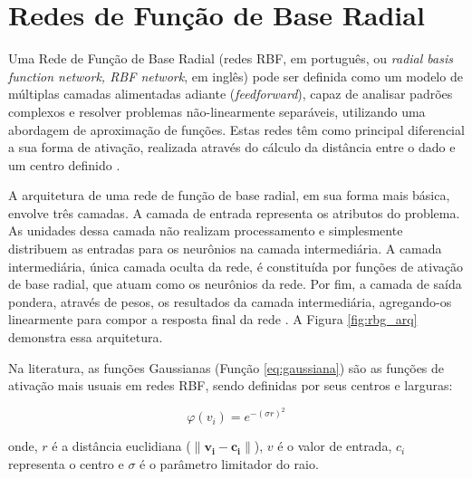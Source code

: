 \documentclass[msc, classic, a4paper]{ufbathesis}
\begin{document}
\section{Redes de Função de Base Radial}

Uma Rede de Função de Base Radial (redes RBF, em português,  ou \textit{radial basis function network, RBF network}, em inglês) pode ser definida como um modelo de múltiplas camadas alimentadas adiante (\textit{feedforward}),
capaz de analisar padrões complexos e resolver problemas não-linearmente separáveis, utilizando uma abordagem de aproximação de funções.
Estas redes têm como principal diferencial a sua forma de ativação, realizada através do cálculo da distância entre o dado e um centro definido \cite{Braga:RedesNeuraisTeoriaAplicacoes}.

A arquitetura de uma rede de função de base radial, em sua forma mais básica, envolve três camadas.
A camada de entrada representa os atributos do problema. As unidades dessa camada não realizam processamento e simplesmente distribuem as entradas para os neurônios na camada intermediária.
A camada intermediária, única camada oculta da rede, é constituída por funções de ativação de base radial, que atuam como os neurônios da rede.
Por fim, a camada de saída pondera, através de pesos, os resultados da camada intermediária, agregando-os linearmente para compor a resposta final da rede \cite{Rojas:1996:NNS:235222}.
A Figura \ref{fig:rbg_arq} demonstra essa arquitetura.

Na literatura, as funções Gaussianas (Função \ref{eq:gaussiana}) são as funções de ativação mais usuais em redes RBF, sendo definidas por seus centros e larguras:

\begin{equation}
    \label{eq:gaussiana}
    \varphi (v_{i})=e^{-(\sigma r)^{2}}
\end{equation}


onde, $r$ é a distância euclidiana ($\|\mathbf {v_{i}} - \mathbf {c_{i}}\|$), $v$ é o valor de entrada, $c_i$ representa o centro e $\sigma$ é o parâmetro limitador do raio.
\end{document}
